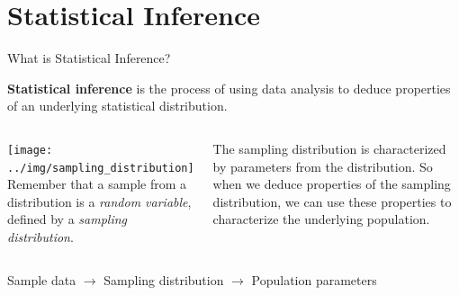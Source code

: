 
\section{Statistical Inference}
\begin{frame}{What is Statistical Inference?}
  \begin{block}{}
    {\bf Statistical inference} is the process of using data analysis to deduce properties of an underlying statistical distribution.
  \end{block}\bigskip
  \begin{columns}
      \texttt{[image: ../img/sampling\_distribution]}
      Remember that a sample from a distribution is a \emph{random variable}, defined by a \emph{sampling distribution}. \medskip

      The sampling distribution is characterized by parameters from the distribution. So when we deduce properties of the sampling distribution, we can use these properties to characterize the underlying population.
  \end{columns}\bigskip

  \begin{center}
  Sample data $\rightarrow$ Sampling distribution $\rightarrow$ Population parameters
  \end{center}
\end{frame}

